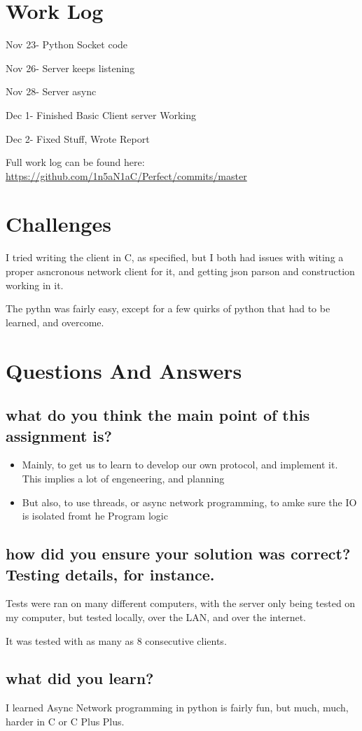 \documentclass[letterpaper,10pt,titlepage]{article}
\begin{document}
\section{Work Log}

Nov 23- Python Socket code

Nov 26- Server keeps listening

Nov 28- Server async

Dec 1- Finished Basic Client server Working

Dec 2- Fixed Stuff, Wrote Report

Full work log can be found here:
\url{https://github.com/1n5aN1aC/Perfect/commits/master}

\section{Challenges}

I tried writing the client in C, as specified, but I both had issues with witing a proper asncronous network client for it, and getting json parson and construction working in it.

The pythn was fairly easy, except for a few quirks of python that had to be learned, and overcome.

\section{Questions And Answers}

\subsection{what do you think the main point of this assignment is?}

\begin{itemize}
\item Mainly, to get us to learn to develop our own protocol, and implement it.  This implies a lot of engeneering, and planning
\item But also, to use threads, or async network programming, to amke sure the IO is isolated fromt he Program logic
\end{itemize}

\subsection{how did you ensure your solution was correct? Testing details, for instance.}

Tests were ran on many different computers, with the server only being tested on my computer, but tested locally, over the LAN, and over the internet.

It was tested with as many as 8 consecutive clients.

\subsection{what did you learn?}

I learned Async Network programming in python is fairly fun, but much, much, harder in C or C Plus Plus.
\end{document}
